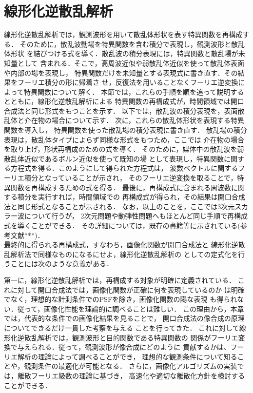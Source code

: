 \section{線形化逆散乱解析}
線形化逆散乱解析では，観測波形を用いて散乱体形状を表す特異関数を再構成する．
そのために，散乱波動場を特異関数を含む積分で表現し，観測波形と散乱体形状
を結びつける式を導く．散乱波の積分表現には，特異関数と散乱場が未知量として
含まれる．そこで，高周波近似や弱散乱体近似を使って散乱体表面や内部の場を表現し，
特異関数だけを未知量とする表現式に書き直す．その結果をフーリエ積分の形に帰着さ
せ，反復法を用いることなくフーリエ逆変換によって特異関数について解く．
本節では，これらの手順を順を追って説明するとともに，線形化逆散乱解析による
特異関数の再構成式が，時間領域では開口合成法と同じ形式をもつことを示す．
以下では，散乱波の積分表現を，表面散乱体と介在物の場合について示す．
次に，これらの散乱体形状を表現する特異関数を導入し，
特異関数を使った散乱場の積分表現に書き直す．
散乱場の積分表現は，散乱体タイプによらず同様な形式をもつため，ここでは
介在物の場合を取り上げ，形状再構成のための式を導く．
そのために，媒体中の散乱波を弱散乱体近似であるボルン近似を使って既知の場
として表現し，特異関数に関する方程式を得る．このようにして得られた方程式は，
波数ベクトルに関するフーリエ積分となっていることが示され，
そのフーリエ逆変換を取ることで，特異関数を再構成するための式を得る．
最後に，再構成式に含まれる周波数に関する積分を実行すれば，時間領域での
再構成式が得られ，その結果は開口合成法と同じ形式となることが示される．
なお，以上のことを，ここでは3次元スカラー波について行うが，
2次元問題や動弾性問題へもほとんど同じ手順で再構成式を導くことができる．
その詳細については，既存の書籍等に示されている(参考文献***)．
\\
最終的に得られる再構成式，すなわち，画像化関数が開口合成法と
線形化逆散乱解析法で同様なものになるにせよ，線形化逆散乱解析の
としての定式化を行うことには次のような意義がある．

第一に，線形化逆散乱解析では，再構成する対象が明確に定義されている．
これに対して開口合成法では，画像化関数が正確に何を表現しているのか
は明確でなく，理想的な計測条件でのPSFを除き，画像化関数の陽な表現
も得られない．従って，画像化性能を理論的に調べることは難しい．
この理由から，本章では，代表的な条件での画像化結果を見ることで，
開口合成法の像合成の原理についてできるだけ一貫した考察を与える
ことを行ってきた．
これに対して線形化逆散乱解析では，観測波形と目的関数である特異関数の
関係がフーリエ変換で与えられる．従って，観測波形が像合成にどのように
貢献するかは、フーリエ解析の理論によって調べることができ，
理想的な観測条件について知ることや，観測条件の最適化が可能となる．
さらに，画像化アルゴリズムの実装では，離散フーリエ級数の理論に基づき，
高速化や適切な離散化方針を検討することができる．

